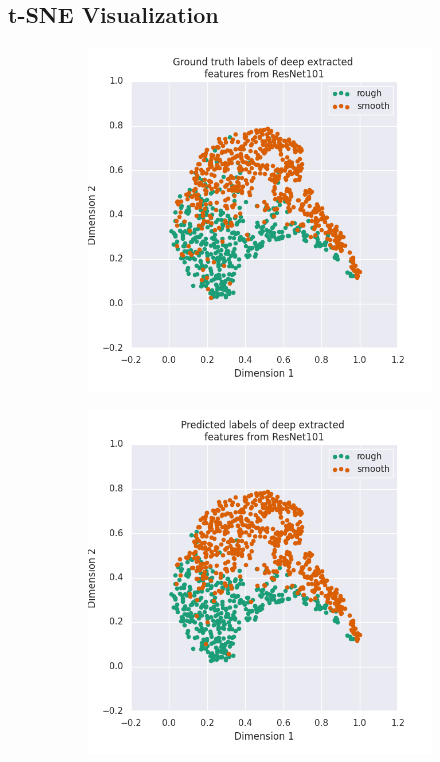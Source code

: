 \documentclass{aci}
\numberwithin{equation}{section}
\begin{document}
\subsection{t-SNE Visualization}

\begin{figure}[h]
    \centering
    \begin{subfigure}{.45\textwidth}
        \includegraphics[width=1\linewidth]{thesis_assets/plots/resnet101_gt_tsne.png}
    \end{subfigure}
    \begin{subfigure}{.45\textwidth}
        \includegraphics[width=1\linewidth]{thesis_assets/plots/resnet101_pred_tsne.png}

\end{subfigure}
\end{figure}
\end{document}
